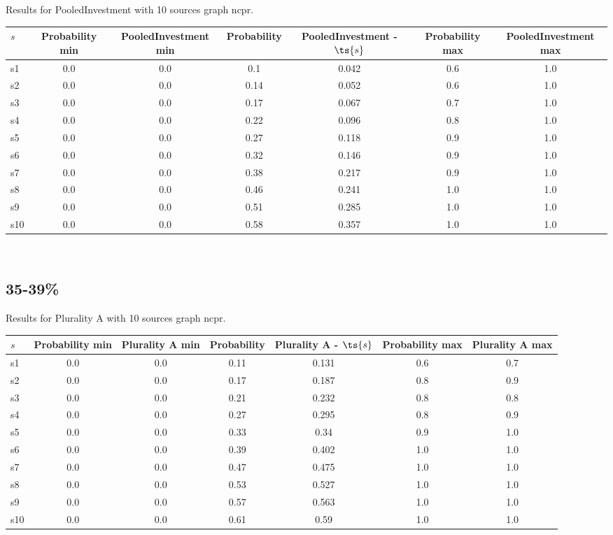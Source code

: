 \documentclass{article}
\begin{document}
\noindent Results for PooledInvestment with 10 sources graph ncpr.

\noindent\begin{tabular}{|l|c|c|c|c|c|c|}
\hline
$s$& Probability min & PooledInvestment min & Probability & PooledInvestment - $\ts{s}$ & Probability max & PooledInvestment max\\
\hline
s1 &0.0 & 0.0 & 0.1 & 0.042 & 0.6 & 1.0\\
\hline
s2 &0.0 & 0.0 & 0.14 & 0.052 & 0.6 & 1.0\\
\hline
s3 &0.0 & 0.0 & 0.17 & 0.067 & 0.7 & 1.0\\
\hline
s4 &0.0 & 0.0 & 0.22 & 0.096 & 0.8 & 1.0\\
\hline
s5 &0.0 & 0.0 & 0.27 & 0.118 & 0.9 & 1.0\\
\hline
s6 &0.0 & 0.0 & 0.32 & 0.146 & 0.9 & 1.0\\
\hline
s7 &0.0 & 0.0 & 0.38 & 0.217 & 0.9 & 1.0\\
\hline
s8 &0.0 & 0.0 & 0.46 & 0.241 & 1.0 & 1.0\\
\hline
s9 &0.0 & 0.0 & 0.51 & 0.285 & 1.0 & 1.0\\
\hline
s10 &0.0 & 0.0 & 0.58 & 0.357 & 1.0 & 1.0\\
\hline
\end{tabular}\\

\newpage

\subsection{35-39\%}

\noindent Results for Plurality A with 10 sources graph ncpr.

\noindent\begin{tabular}{|l|c|c|c|c|c|c|}
\hline
$s$& Probability min & Plurality A min & Probability & Plurality A - $\ts{s}$ & Probability max & Plurality A max\\
\hline
s1 &0.0 & 0.0 & 0.11 & 0.131 & 0.6 & 0.7\\
\hline
s2 &0.0 & 0.0 & 0.17 & 0.187 & 0.8 & 0.9\\
\hline
s3 &0.0 & 0.0 & 0.21 & 0.232 & 0.8 & 0.8\\
\hline
s4 &0.0 & 0.0 & 0.27 & 0.295 & 0.8 & 0.9\\
\hline
s5 &0.0 & 0.0 & 0.33 & 0.34 & 0.9 & 1.0\\
\hline
s6 &0.0 & 0.0 & 0.39 & 0.402 & 1.0 & 1.0\\
\hline
s7 &0.0 & 0.0 & 0.47 & 0.475 & 1.0 & 1.0\\
\hline
s8 &0.0 & 0.0 & 0.53 & 0.527 & 1.0 & 1.0\\
\hline
s9 &0.0 & 0.0 & 0.57 & 0.563 & 1.0 & 1.0\\
\hline
s10 &0.0 & 0.0 & 0.61 & 0.59 & 1.0 & 1.0\\
\hline
\end{tabular}\\
\end{document}
